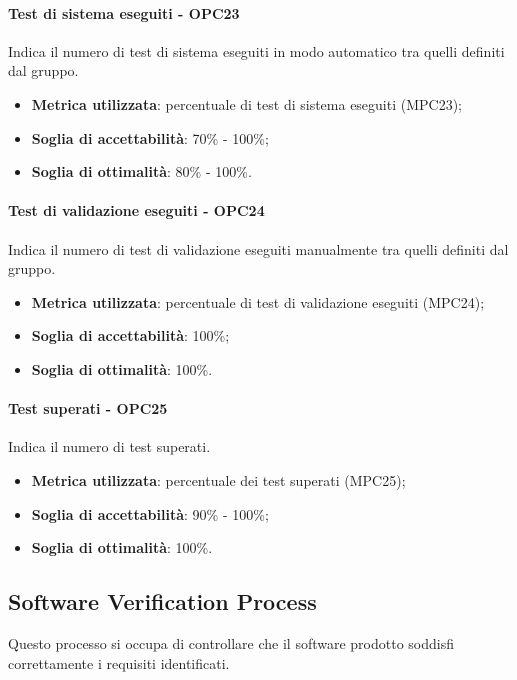 \documentclass[PianoDiQualifica.tex]{subfiles}
\begin{document}
			\paragraph{Test di sistema eseguiti - OPC23}
				Indica il numero di test di sistema eseguiti in modo automatico tra quelli definiti dal gruppo.
				\begin{itemize}
					\item \textbf{Metrica utilizzata}: percentuale di test di sistema eseguiti (MPC23);
					\item \textbf{Soglia di accettabilità}: 70\% - 100\%;
					\item \textbf{Soglia di ottimalità}: 80\% - 100\%.
				\end{itemize}
				
			\paragraph{Test di validazione eseguiti - OPC24}
				Indica il numero di test di validazione eseguiti manualmente tra quelli definiti dal gruppo.
				\begin{itemize}
					\item \textbf{Metrica utilizzata}: percentuale di test di validazione eseguiti (MPC24);
					\item \textbf{Soglia di accettabilità}: 100\%;
					\item \textbf{Soglia di ottimalità}: 100\%.
				\end{itemize}
				
			\paragraph{Test superati - OPC25}
				Indica il numero di test superati.
				\begin{itemize}
					\item \textbf{Metrica utilizzata}: percentuale dei test superati (MPC25);
					\item \textbf{Soglia di accettabilità}: 90\% - 100\%;
					\item \textbf{Soglia di ottimalità}: 100\%.
				\end{itemize}
					
	\subsection{Software Verification Process}
		Questo processo si occupa di controllare che il software prodotto soddisfi correttamente i requisiti identificati.
		
\end{document}

